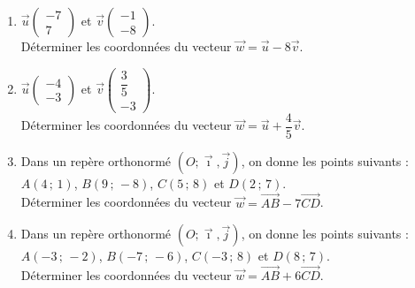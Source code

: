 {%
\begin{Exercice}%
\leavevmode\vspace{-\baselineskip}
\begin{enumerate}[itemsep=1em]
	\item \begin{minipage}[t]{\linewidth} $\overrightarrow{u}\begin{pmatrix}-7\\7\end{pmatrix}$ et $\overrightarrow{v}\begin{pmatrix}-1\\-8\end{pmatrix}$.\\Déterminer les coordonnées du vecteur $\overrightarrow{w}=\overrightarrow{u}-8\overrightarrow{v}$.\end{minipage}
	\item \begin{minipage}[t]{\linewidth} $\overrightarrow{u}\begin{pmatrix}-4\\[0.7em]-3\end{pmatrix}$ et $\overrightarrow{v}\begin{pmatrix}\dfrac{3}{5}\\[0.7em]-3\end{pmatrix}$.\\Déterminer les coordonnées du vecteur $\overrightarrow{w}=\overrightarrow{u}+\dfrac{4}{5}\overrightarrow{v}$.\end{minipage}
	\item \begin{minipage}[t]{\linewidth}Dans un repère orthonormé $(O;\vec \imath, \overrightarrow{j})$, on donne les points suivants : $A\left(4\,;\,1\right)$, $B\left(9\,;\,-8\right)$, $C\left(5\,;\,8\right)$ et $D\left(2\,;\,7\right)$.\\Déterminer les coordonnées du vecteur $\overrightarrow{w}=\overrightarrow{AB}-7\overrightarrow{CD}$.\end{minipage}
	\item \begin{minipage}[t]{\linewidth}Dans un repère orthonormé $(O;\vec \imath, \overrightarrow{j})$, on donne les points suivants : $A\left(-3\,;\,-2\right)$, $B\left(-7\,;\,-6\right)$, $C\left(-3\,;\,8\right)$ et $D\left(8\,;\,7\right)$.\\Déterminer les coordonnées du vecteur $\overrightarrow{w}=\overrightarrow{AB}+6\overrightarrow{CD}$.\end{minipage}

\end{enumerate}
\end{Exercice}}
